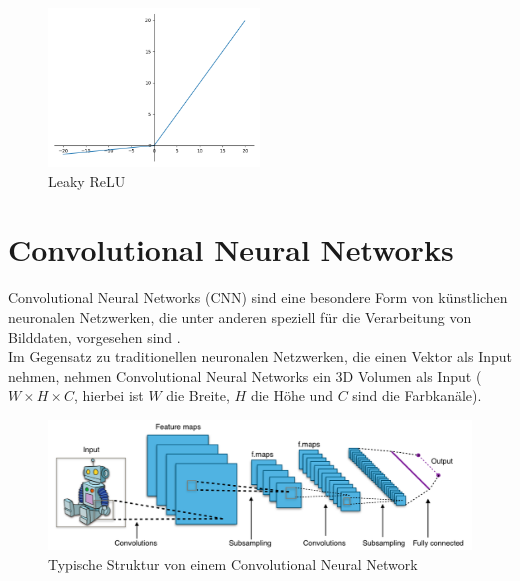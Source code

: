 \begin{figure}[H]
  \centering
  \includegraphics[width=0.5\textwidth]{resources/nn/leaky-relu.png}
  \caption{
    Leaky ReLU 
    \cite{leaky-relu}
  }
  \label{image:leaky-relu}
\end{figure}

\section{Convolutional Neural Networks}
Convolutional Neural Networks (\gls{CNN}) sind eine besondere Form von künstlichen neuronalen Netzwerken, die unter anderen speziell für 
die Verarbeitung von Bilddaten, vorgesehen sind \cite{convnet-erklaerung}.
\\
Im Gegensatz zu traditionellen neuronalen Netzwerken, die einen Vektor als Input nehmen, nehmen Convolutional Neural Networks ein 3D Volumen als Input
($ W \times H \times C $, hierbei ist $W$ die Breite, $H$ die Höhe und $C$ sind die Farbkanäle).

\begin{figure}[H]
  \centering
  \includegraphics[width=1\textwidth]{resources/cnn/typical_cnn.png}
  \caption{
    Typische Struktur von einem Convolutional Neural Network
    \cite{typical_cnn_img}
  }
  \label{image:typical_cnn_img}
\end{figure}



